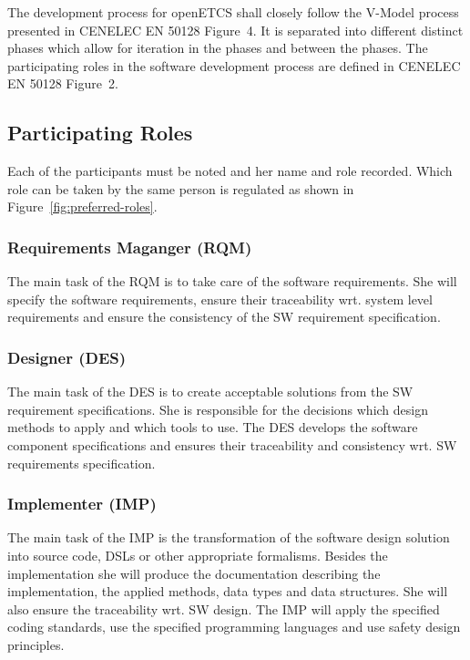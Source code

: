 
The development process for openETCS shall closely follow the V-Model process
presented in CENELEC EN 50128 Figure~4. It is separated into different distinct
phases which allow for iteration in the phases and between the phases. The
participating roles in the software development process are defined in CENELEC
EN 50128 Figure~2.

\subsection{Participating Roles}
\label{sec:participating-roles}

Each of the participants must be noted and her name and role recorded. Which
role can be taken by the same person is regulated as shown in
Figure~\ref{fig:preferred-roles}.

\subsubsection{Requirements Maganger (RQM)}
\label{sec:requ-magang-rqm}

The main task of the RQM is to take care of the software requirements. She will
specify the software requirements, ensure their traceability wrt. system level
requirements and ensure the consistency of the SW requirement specification.

\subsubsection{Designer (DES)}
\label{sec:designer}

The main task of the DES is to create acceptable solutions from the SW
requirement specifications. She is responsible for the decisions which design
methods to apply and which tools to use. The DES develops the software component
specifications and ensures their traceability and consistency wrt. SW
requirements specification.

\subsubsection{Implementer (IMP)}
\label{sec:implementer}

The main task of the IMP is the transformation of the software design solution
into source code, DSLs or other appropriate formalisms. Besides the
implementation she will produce the documentation describing the implementation,
the applied methods, data types and data structures. She will also ensure the
traceability wrt. SW design. The IMP will apply the specified coding standards,
use the specified programming languages and use safety design principles.

